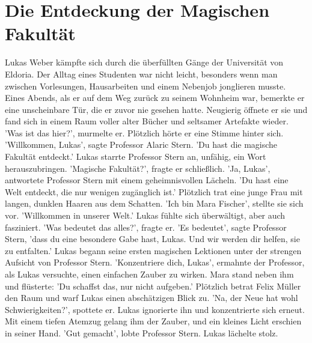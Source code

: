 \documentclass[12pt]{article}
\begin{document}
\section{ Die Entdeckung der Magischen Fakultät }
Lukas Weber kämpfte sich durch die überfüllten Gänge der Universität von Eldoria. Der Alltag eines Studenten war nicht leicht, besonders wenn man zwischen Vorlesungen, Hausarbeiten und einem Nebenjob jonglieren musste. Eines Abends, als er auf dem Weg zurück zu seinem Wohnheim war, bemerkte er eine unscheinbare Tür, die er zuvor nie gesehen hatte. Neugierig öffnete er sie und fand sich in einem Raum voller alter Bücher und seltsamer Artefakte wieder. 'Was ist das hier?', murmelte er. Plötzlich hörte er eine Stimme hinter sich. 'Willkommen, Lukas', sagte Professor Alaric Stern. 'Du hast die magische Fakultät entdeckt.' Lukas starrte Professor Stern an, unfähig, ein Wort herauszubringen. 'Magische Fakultät?', fragte er schließlich. 'Ja, Lukas', antwortete Professor Stern mit einem geheimnisvollen Lächeln. 'Du hast eine Welt entdeckt, die nur wenigen zugänglich ist.' Plötzlich trat eine junge Frau mit langen, dunklen Haaren aus dem Schatten. 'Ich bin Mara Fischer', stellte sie sich vor. 'Willkommen in unserer Welt.' Lukas fühlte sich überwältigt, aber auch fasziniert. 'Was bedeutet das alles?', fragte er. 'Es bedeutet', sagte Professor Stern, 'dass du eine besondere Gabe hast, Lukas. Und wir werden dir helfen, sie zu entfalten.' Lukas begann seine ersten magischen Lektionen unter der strengen Aufsicht von Professor Stern. 'Konzentriere dich, Lukas', ermahnte der Professor, als Lukas versuchte, einen einfachen Zauber zu wirken. Mara stand neben ihm und flüsterte: 'Du schaffst das, nur nicht aufgeben.' Plötzlich betrat Felix Müller den Raum und warf Lukas einen abschätzigen Blick zu. 'Na, der Neue hat wohl Schwierigkeiten?', spottete er. Lukas ignorierte ihn und konzentrierte sich erneut. Mit einem tiefen Atemzug gelang ihm der Zauber, und ein kleines Licht erschien in seiner Hand. 'Gut gemacht', lobte Professor Stern. Lukas lächelte stolz.
\end{document}
